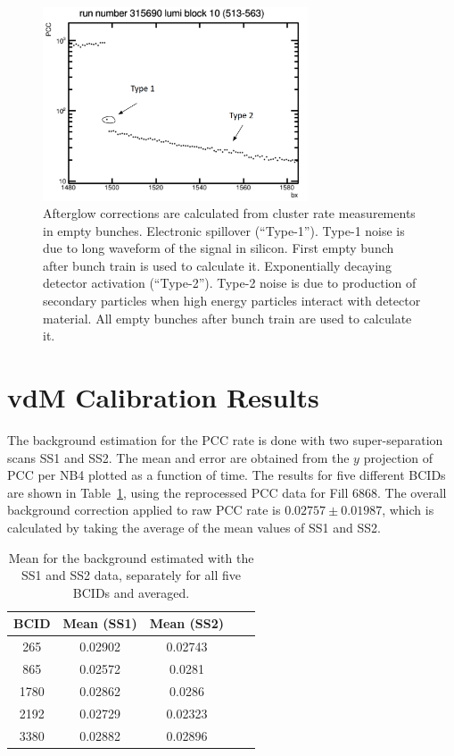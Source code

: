 \begin{figure}[!htp]
\centering
\includegraphics[width=0.7\textwidth]{ashish_thesis/afterglow_type1_type2.png}
\caption{%
Afterglow corrections are calculated from cluster rate measurements in empty bunches. Electronic spillover (“Type-1”). Type-1 noise is due to long waveform of the signal in silicon. First empty bunch after bunch train is used to calculate it. Exponentially decaying detector activation (“Type-2”).  Type-2 noise is due to production of secondary particles when high energy particles interact with detector material. All empty bunches after bunch train are used to calculate it.
}
\label{fig:pcc_afterglow}
\end{figure}


\section{vdM Calibration Results}


The background estimation for the PCC rate is done with two super-separation scans SS1 and SS2. The mean and error are obtained from the $y$ projection of PCC per NB4 plotted as a function of time. The results for five different BCIDs are shown in Table~\ref{tab:vdm:SS1_SS2}, using the reprocessed PCC data for Fill 6868. The overall background correction applied to raw PCC rate is $0.02757\pm0.01987$, which is calculated by taking the average of the mean values of SS1 and SS2.


\begin{table}
  \begin{center}
    \begin{tabular}{ccccc}
    \textbf{BCID}   & \textbf{Mean (SS1)} & \textbf{Mean (SS2)} \\ \hline
      265     &  0.02902    &  0.02743    \\
        865  &    0.02572  &     0.0281  \\
       1780    &  0.02862   &     0.0286  \\
       2192   &  0.02729  &     0.02323  \\
        3380  &  0.02882  &    0.02896   \\
      \end{tabular}
    \caption[Background in PCC rate]{Mean for the background estimated with the SS1 and SS2 data, separately for all five BCIDs and averaged.}
    \label{tab:vdm:SS1_SS2}
  \end{center}
\end{table}

